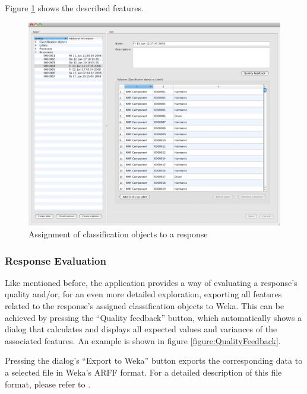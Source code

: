 Figure \ref{figure:COAssignment} shows the described features.

\begin{figure}
    \includegraphics[width=\textwidth]{images/COAssignment.png}
    \caption{%
        \label{figure:COAssignment}%
        Assignment of classification objects to a response
    }
\end{figure}


\subsubsection{Response Evaluation}

Like mentioned before, the application provides a way of evaluating a response's
quality and/or, for an even more detailed exploration, exporting all features
related to the response's assigned classification objects to Weka.  This can be
achieved by pressing the ``Quality feedback'' button, which automatically shows
a dialog that calculates and displays all expected values and variances of the
associated features. An example is shown in figure \ref{figure:QualityFeedback}.

Pressing the dialog's ``Export to Weka'' button exports the corresponding data
to a selected file in Weka's ARFF format. For a detailed description of this
file format, please refer to \cite{Weka}.

